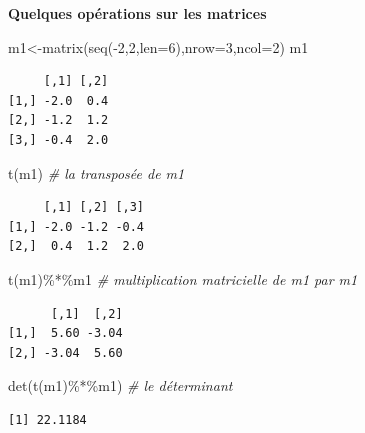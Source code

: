 \documentclass[
  8pt,
  ignorenonframetext,
]{beamer}
\newenvironment{Shaded}{\begin{snugshade}}{\end{snugshade}}
\newcommand{\AttributeTok}[1]{\textcolor[rgb]{0.77,0.63,0.00}{#1}}
\newcommand{\CommentTok}[1]{\textcolor[rgb]{0.56,0.35,0.01}{\textit{#1}}}
\newcommand{\DecValTok}[1]{\textcolor[rgb]{0.00,0.00,0.81}{#1}}
\newcommand{\FunctionTok}[1]{\textcolor[rgb]{0.00,0.00,0.00}{#1}}
\newcommand{\NormalTok}[1]{#1}
\newcommand{\OtherTok}[1]{\textcolor[rgb]{0.56,0.35,0.01}{#1}}
\newcommand{\SpecialCharTok}[1]{\textcolor[rgb]{0.00,0.00,0.00}{#1}}
\begin{document}
\begin{frame}[fragile]{}
\protect\hypertarget{section-3}{}
\textbf{Quelques opérations sur les matrices}

\begin{Shaded}
\begin{Highlighting}[]
\NormalTok{m1}\OtherTok{\textless{}{-}}\FunctionTok{matrix}\NormalTok{(}\FunctionTok{seq}\NormalTok{(}\SpecialCharTok{{-}}\DecValTok{2}\NormalTok{,}\DecValTok{2}\NormalTok{,}\AttributeTok{len=}\DecValTok{6}\NormalTok{),}\AttributeTok{nrow=}\DecValTok{3}\NormalTok{,}\AttributeTok{ncol=}\DecValTok{2}\NormalTok{)}
\NormalTok{m1}
\end{Highlighting}
\end{Shaded}

\begin{verbatim}
     [,1] [,2]
[1,] -2.0  0.4
[2,] -1.2  1.2
[3,] -0.4  2.0
\end{verbatim}

\begin{Shaded}
\begin{Highlighting}[]
\FunctionTok{t}\NormalTok{(m1)  }\CommentTok{\# la transposée de m1}
\end{Highlighting}
\end{Shaded}

\begin{verbatim}
     [,1] [,2] [,3]
[1,] -2.0 -1.2 -0.4
[2,]  0.4  1.2  2.0
\end{verbatim}

\begin{Shaded}
\begin{Highlighting}[]
\FunctionTok{t}\NormalTok{(m1)}\SpecialCharTok{\%*\%}\NormalTok{m1 }\CommentTok{\# multiplication matricielle de m1\textquotesingle{} par m1}
\end{Highlighting}
\end{Shaded}

\begin{verbatim}
      [,1]  [,2]
[1,]  5.60 -3.04
[2,] -3.04  5.60
\end{verbatim}

\begin{Shaded}
\begin{Highlighting}[]
\FunctionTok{det}\NormalTok{(}\FunctionTok{t}\NormalTok{(m1)}\SpecialCharTok{\%*\%}\NormalTok{m1) }\CommentTok{\# le déterminant }
\end{Highlighting}
\end{Shaded}

\begin{verbatim}
[1] 22.1184
\end{verbatim}
\end{frame}
\end{document}
